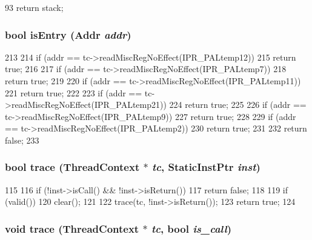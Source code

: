 \begin{DoxyCode}
93 { return stack; }
\end{DoxyCode}
\hypertarget{classAlphaISA_1_1StackTrace_a8c9787d05f9c0e82dfcaf31cf0fd4b50}{
\subsubsection[{isEntry}]{\setlength{\rightskip}{0pt plus 5cm}bool isEntry ({\bf Addr} {\em addr})}}
\label{classAlphaISA_1_1StackTrace_a8c9787d05f9c0e82dfcaf31cf0fd4b50}



\begin{DoxyCode}
213 {
214     if (addr == tc->readMiscRegNoEffect(IPR_PALtemp12))
215         return true;
216 
217     if (addr == tc->readMiscRegNoEffect(IPR_PALtemp7))
218         return true;
219 
220     if (addr == tc->readMiscRegNoEffect(IPR_PALtemp11))
221         return true;
222 
223     if (addr == tc->readMiscRegNoEffect(IPR_PALtemp21))
224         return true;
225 
226     if (addr == tc->readMiscRegNoEffect(IPR_PALtemp9))
227         return true;
228 
229     if (addr == tc->readMiscRegNoEffect(IPR_PALtemp2))
230         return true;
231 
232     return false;
233 }
\end{DoxyCode}
\hypertarget{classAlphaISA_1_1StackTrace_aabb136846a5e22007e44db846652ddd5}{
\subsubsection[{trace}]{\setlength{\rightskip}{0pt plus 5cm}bool trace ({\bf ThreadContext} $\ast$ {\em tc}, \/  {\bf StaticInstPtr} {\em inst})}}
\label{classAlphaISA_1_1StackTrace_aabb136846a5e22007e44db846652ddd5}



\begin{DoxyCode}
115 {
116     if (!inst->isCall() && !inst->isReturn())
117         return false;
118 
119     if (valid())
120         clear();
121 
122     trace(tc, !inst->isReturn());
123     return true;
124 }
\end{DoxyCode}
\hypertarget{classAlphaISA_1_1StackTrace_a46d6b95a2e5fdb75702cf45e39566645}{
\subsubsection[{trace}]{\setlength{\rightskip}{0pt plus 5cm}void trace ({\bf ThreadContext} $\ast$ {\em tc}, \/  bool {\em is\_\-call})}}
\label{classAlphaISA_1_1StackTrace_a46d6b95a2e5fdb75702cf45e39566645}



